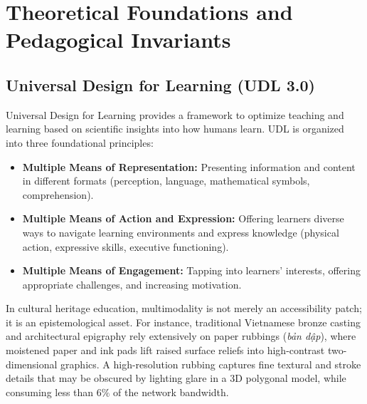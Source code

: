 \documentclass[11pt,a4paper]{article}
\begin{document}
\section{Theoretical Foundations and Pedagogical Invariants}

\subsection{Universal Design for Learning (UDL 3.0)}
Universal Design for Learning provides a framework to optimize teaching and learning based on scientific insights into how humans learn. UDL is organized into three foundational principles:
\begin{itemize}
    \item \textbf{Multiple Means of Representation:} Presenting information and content in different formats (perception, language, mathematical symbols, comprehension).
    \item \textbf{Multiple Means of Action and Expression:} Offering learners diverse ways to navigate learning environments and express knowledge (physical action, expressive skills, executive functioning).
    \item \textbf{Multiple Means of Engagement:} Tapping into learners' interests, offering appropriate challenges, and increasing motivation.
\end{itemize}

In cultural heritage education, multimodality is not merely an accessibility patch; it is an epistemological asset. For instance, traditional Vietnamese bronze casting and architectural epigraphy rely extensively on paper rubbings (\textit{bản dập}), where moistened paper and ink pads lift raised surface reliefs into high-contrast two-dimensional graphics. A high-resolution rubbing captures fine textural and stroke details that may be obscured by lighting glare in a 3D polygonal model, while consuming less than $6\%$ of the network bandwidth.
\end{document}
